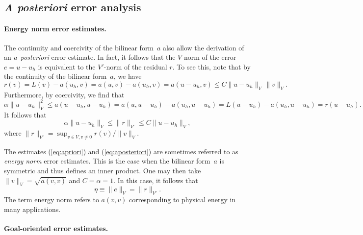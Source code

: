 \subsection{\emph{A posteriori} error analysis}

\paragraph{Energy norm error estimates.}

The continuity and coercivity of the bilinear form~$a$ also allow the
derivation of an \emph{a~posteriori} error estimate.  In fact, it
follows that the $V$-norm of the error $e = u - u_h$ is equivalent to
the $V'$-norm of the residual $r$. To see this, note that by the
continuity of the bilinear form~$a$, we have
\begin{equation}
  r(v)
  = L(v) - a(u_h, v) = a(u, v) - a(u_h, v) = a(u - u_h, v)
  \leqslant C \|u - u_h\|_V \, \|v\|_V.
\end{equation}
Furthermore, by coercivity, we find that
\begin{equation}
  \alpha \|u - u_h\|^2_V
  \leqslant a(u - u_h, u - u_h)
  = a(u, u - u_h) - a(u_h, u - u_h)
  = L(u - u_h) - a(u_h, u - u_h) = r(u - u_h).
\end{equation}
It follows that
\begin{equation} \label{eq:aposteriori}
  \alpha \|u - u_h\|_V \leqslant \|r\|_{V'} \leqslant C \|u - u_h\|_V,
\end{equation}
where $\|r\|_{V'} = \sup_{v \in V, v \neq 0} r(v)/ \|v\|_V$.

The estimates (\ref{eq:apriori}) and (\ref{eq:aposteriori}) are
sometimes referred to as \emph{energy norm} error estimates. This is
the case when the bilinear form~$a$ is symmetric and thus defines an
inner product. One may then take $\|v\|_V = \sqrt{a(v, v)}$ and $C =
\alpha = 1$. In this case, it follows that
\begin{equation} \label{eq:aposteriori,energynorm}
  \eta \equiv \|e\|_V = \|r\|_{V'}.
\end{equation}
The term energy norm refers to $a(v, v)$ corresponding to physical
energy in many applications.


\vspace*{-6pt}\paragraph{Goal-oriented error estimates.}

